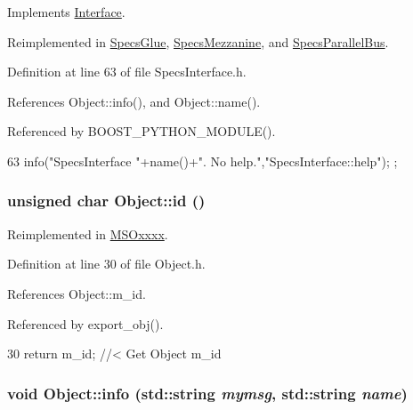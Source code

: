 Implements \hyperlink{classInterface_aedd3cf1d964c837e7848ccf81dc9c760}{Interface}.

Reimplemented in \hyperlink{classSpecsGlue_a04fd0c122ac6980833fd87af92377791}{SpecsGlue}, \hyperlink{classSpecsMezzanine_a9cbb99c91d987194009be1cb81d2ba7c}{SpecsMezzanine}, and \hyperlink{classSpecsParallelBus_a67b05d066de051d33a6afff267f9178e}{SpecsParallelBus}.

Definition at line 63 of file SpecsInterface.h.

References Object::info(), and Object::name().

Referenced by BOOST\_\-PYTHON\_\-MODULE().


\begin{DoxyCode}
63 { info("SpecsInterface "+name()+". No help.","SpecsInterface::help"); };
\end{DoxyCode}
\hypertarget{classObject_af99145335cc61ff6e2798ea17db009d2}{
\subsubsection[{id}]{\setlength{\rightskip}{0pt plus 5cm}unsigned char Object::id ()}}
\label{classObject_af99145335cc61ff6e2798ea17db009d2}


Reimplemented in \hyperlink{classMSOxxxx_a0f14b23d31d8e7647184e99a89600cc3}{MSOxxxx}.

Definition at line 30 of file Object.h.

References Object::m\_\-id.

Referenced by export\_\-obj().


\begin{DoxyCode}
30 { return m_id;         } //< Get Object m_id 
\end{DoxyCode}
\hypertarget{classObject_a1ca123253dfd30fc28b156f521dcbdae}{
\subsubsection[{info}]{\setlength{\rightskip}{0pt plus 5cm}void Object::info (std::string {\em mymsg}, \/  std::string {\em name})}}
\label{classObject_a1ca123253dfd30fc28b156f521dcbdae}


